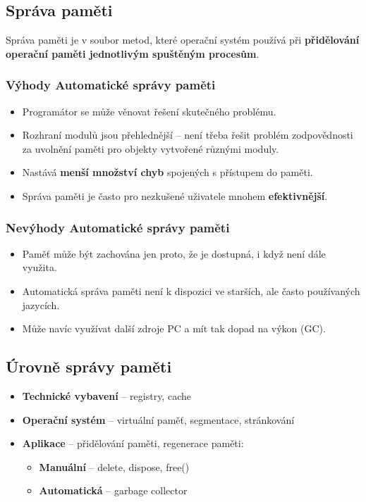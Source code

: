 \subsection{Správa paměti}
Správa paměti je v soubor metod, které operační systém používá při \textbf{přidělování operační paměti jednotlivým spuštěným procesům}.

\subsubsection*{Výhody Automatické správy paměti}
\begin{itemize}
\item Programátor se může věnovat řešení skutečného problému.
\item Rozhraní modulů jsou přehlednější -- není třeba řešit problém zodpovědnosti za uvolnění paměti pro objekty vytvořené různými moduly.
\item Nastává \textbf{menší množství chyb} spojených s přístupem do paměti.
\item Správa paměti je často pro nezkušené uživatele mnohem \textbf{efektivnější}.
\end{itemize}

\subsubsection*{Nevýhody Automatické správy paměti}
\begin{itemize}
\item Paměť může být zachována jen proto, že je dostupná, i když není dále využita.
\item Automatická správa paměti není k dispozici ve starších, ale často používaných jazycích.
\item Může navíc využívat další zdroje PC a mít tak dopad na výkon (GC).
\end{itemize}

\subsection{Úrovně správy paměti}
\begin{itemize}
	\item \textbf{Technické vybavení} -- registry, cache
	\item \textbf{Operační systém} -- virtuální paměť, segmentace, stránkování
	\item \textbf{Aplikace} -- přidělování paměti, regenerace paměti:
	\begin{itemize}
		\item \textbf{Manuální} -- delete, dispose, free()
		\item \textbf{Automatická} -- garbage collector
	\end{itemize}
\end{itemize}

